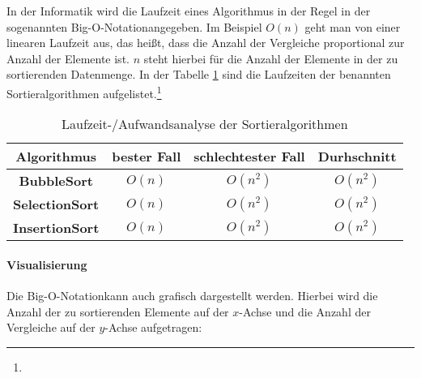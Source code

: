 \documentclass[./entry.tex]{subfiles}
\begin{document}
    In der Informatik wird die Laufzeit eines Algorithmus in der Regel in der sogenannten \dq Big-O-Notation\dq angegeben.
    Im Beispiel $O(n)$ geht man von einer linearen Laufzeit aus, das heißt, dass die Anzahl der
    Vergleiche proportional zur Anzahl der Elemente ist.
    $n$ steht hierbei für die Anzahl der Elemente in der zu sortierenden Datenmenge.
    In der Tabelle \ref{tab:runtimeanalysis} sind die Laufzeiten der benannten Sortieralgorithmen aufgelistet.\footnote{}


    \begin{table}[h]
        \begin{tabular}{|c|c|c|c|}
            \hline
            \textbf{Algorithmus}                                                     & \textbf{bester Fall} & \textbf{schlechtester Fall} & \textbf{Durhschnitt} \\
            \hline
            \textbf{BubbleSort}\tablefootnote{\bscite{bubble-sort-aufwand}}          & $O(n)$               & $O(n^2)$                    & $O(n^2)$             \\
            \hline
            \textbf{SelectionSort}\tablefootnote{\bscite{selection-sort-complexity}} & $O(n)$               & $O(n^2)$ & $O(n^2)$ \\
            \hline
            \textbf{InsertionSort}\tablefootnote{\bscite{insertion-sort}}            & $O(n)$               & $O(n^2)$                    & $O(n^2)$             \\
            \hline
        \end{tabular}
        \caption{Laufzeit-/Aufwandsanalyse der Sortieralgorithmen}
        \label{tab:runtimeanalysis}
    \end{table}

    \paragraph{Visualisierung} Die \dq Big-O-Notation\dq kann auch grafisch dargestellt werden.
    Hierbei wird die Anzahl der zu sortierenden Elemente auf der $x$-Achse und die Anzahl der Vergleiche auf der $y$-Achse aufgetragen:
\end{document}
